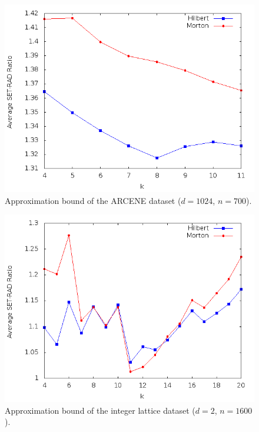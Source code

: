 \documentclass[10pt]{article}
\begin{document}
\begin{figure}
\begin{center}
\includegraphics[scale=0.5]{ArcGra2.png}
\caption{Approximation bound of the ARCENE dataset ($d = 1024$, $n = 700$).}
\label{approx-acrene}
\end{center}
\end{figure}

\begin{figure}
\begin{center}
\includegraphics[scale=0.5]{LatGra2.png}
\caption{Approximation bound of the integer lattice dataset ($d = 2$, $n = 1600$).}
\label{approx-lattice}
\end{center}
\end{figure}



\end{document}

